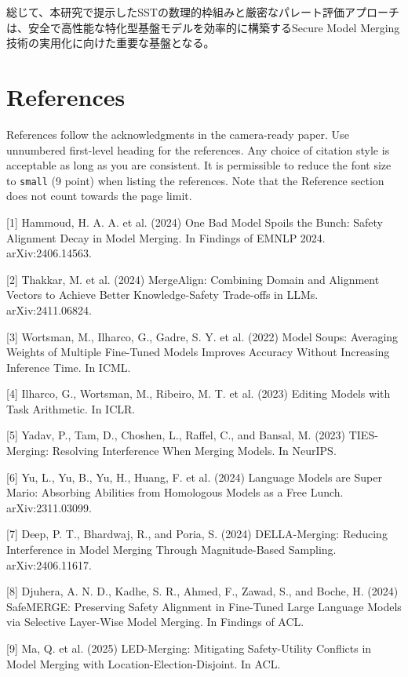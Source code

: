 \documentclass{article}
\begin{document}
総じて、本研究で提示したSSTの数理的枠組みと厳密なパレート評価アプローチは、安全で高性能な特化型基盤モデルを効率的に構築するSecure Model Merging技術の実用化に向けた重要な基盤となる。

\section*{References}

References follow the acknowledgments in the camera-ready paper. Use unnumbered first-level heading for
the references. Any choice of citation style is acceptable as long as you are
consistent. It is permissible to reduce the font size to \verb+small+ (9 point)
when listing the references.
Note that the Reference section does not count towards the page limit.
\medskip

{
\small
[1] Hammoud, H. A. A. et al. (2024) One Bad Model Spoils the Bunch: Safety Alignment Decay in Model Merging. In Findings of EMNLP 2024. arXiv:2406.14563.

[2] Thakkar, M. et al. (2024) MergeAlign: Combining Domain and Alignment Vectors to Achieve Better Knowledge-Safety Trade-offs in LLMs. arXiv:2411.06824.

[3] Wortsman, M., Ilharco, G., Gadre, S. Y. et al. (2022) Model Soups: Averaging Weights of Multiple Fine-Tuned Models Improves Accuracy Without Increasing Inference Time. In ICML.

[4] Ilharco, G., Wortsman, M., Ribeiro, M. T. et al. (2023) Editing Models with Task Arithmetic. In ICLR.

[5] Yadav, P., Tam, D., Choshen, L., Raffel, C., and Bansal, M. (2023) TIES-Merging: Resolving Interference When Merging Models. In NeurIPS.

[6] Yu, L., Yu, B., Yu, H., Huang, F. et al. (2024) Language Models are Super Mario: Absorbing Abilities from Homologous Models as a Free Lunch. arXiv:2311.03099.

[7] Deep, P. T., Bhardwaj, R., and Poria, S. (2024) DELLA-Merging: Reducing Interference in Model Merging Through Magnitude-Based Sampling. arXiv:2406.11617.

[8] Djuhera, A. N. D., Kadhe, S. R., Ahmed, F., Zawad, S., and Boche, H. (2024) SafeMERGE: Preserving Safety Alignment in Fine-Tuned Large Language Models via Selective Layer-Wise Model Merging. In Findings of ACL.

[9] Ma, Q. et al. (2025) LED-Merging: Mitigating Safety-Utility Conflicts in Model Merging with Location-Election-Disjoint. In ACL.

}
\end{document}
